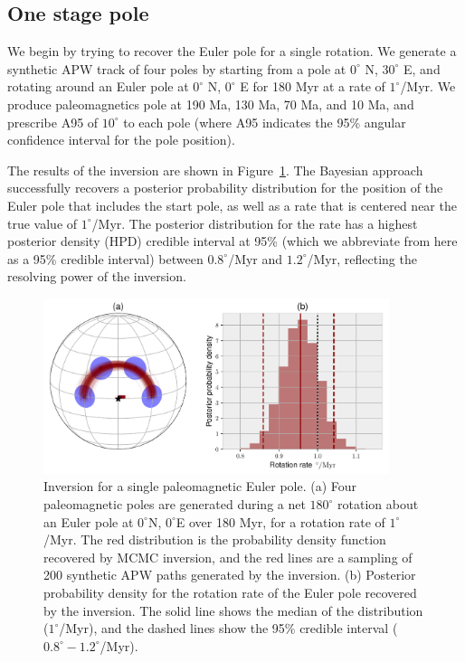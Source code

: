\documentclass[preprint,12pt,authoryear]{elsarticle}
\begin{document}
\subsection{One stage pole}
\label{sec:one_stage_pole}
We begin by trying to recover the Euler pole for a single rotation.
We generate a synthetic APW track of four poles by starting from a pole at $0^\circ$ N, $30^\circ$ E,
and rotating around an Euler pole at $0^\circ$ N, $0^\circ$ E for 180 Myr at a rate of $1^\circ$/Myr.
We produce paleomagnetics pole at 190 Ma, 130 Ma, 70 Ma, and 10 Ma, and prescribe A95
of $10^\circ$ to each pole (where A95 indicates the 95\% angular confidence interval for the pole position).

The results of the inversion are shown in Figure~\ref{fig:one_euler_pole}.
The Bayesian approach successfully recovers a posterior probability distribution for the position
of the Euler pole that includes the start pole, as well as a rate that is centered
near the true value of $1^\circ$/Myr. The posterior distribution for the rate
has a highest posterior density (HPD) credible interval at 95\% 
(which we abbreviate from here as a 95\% credible interval)
between $0.8^\circ$/Myr and $1.2^\circ$/Myr, reflecting the resolving power of the inversion.

\begin{figure}
\includegraphics[width=0.9\textwidth]{figures/synthetic/one_euler_pole.pdf}
\caption[Inversion for a single paleomagnetic Euler pole.]{Inversion for a single paleomagnetic Euler pole. (a) Four paleomagnetic poles are generated during a net $180^\circ$ rotation about an Euler pole at $0^\circ$N, $0^\circ$E over 180 Myr, for a rotation rate of $1^\circ$/Myr. The red distribution is the probability density function recovered by MCMC inversion, and the red lines are a sampling of 200 synthetic APW paths generated by the inversion. (b) Posterior probability density for the rotation rate of the Euler pole recovered by the inversion. The solid line shows the median of the distribution ($1^\circ$/Myr), and the dashed lines show the 95\% credible interval ($0.8^\circ-1.2^\circ$/Myr). }
\label{fig:one_euler_pole}
\end{figure}
\end{document}
